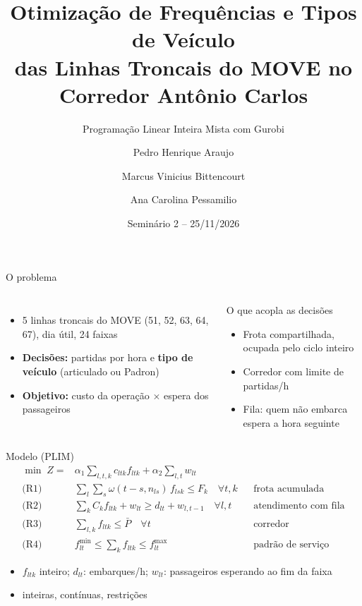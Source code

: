 \documentclass[aspectratio=169,11pt]{beamer}
\title{Otimização de Frequências e Tipos de Veículo\\das Linhas Troncais do MOVE no Corredor Antônio Carlos}
\subtitle{Programação Linear Inteira Mista com Gurobi}
\author{Pedro Henrique Araujo \and Marcus Vinicius Bittencourt \and Ana Carolina Pessamilio}
\institute{Pesquisa Operacional -- DEE/EE/UFMG}
\date{Seminário 2 -- 25/11/2026}
\newcommand{\destaque}[1]{{\color{azul}\textbf{#1}}}
\begin{document}
\begin{frame}
\titlepage
\end{frame}

\begin{frame}{O problema}
\begin{columns}[T]
\begin{itemize}
\item 5 linhas troncais do MOVE (51, 52, 63, 64, 67), dia útil, 24 faixas
\item \destaque{Decisões:} partidas por hora e \destaque{tipo de veículo} (articulado ou Padron)
\item \destaque{Objetivo:} custo da operação $\times$ espera dos passageiros
\end{itemize}
\begin{block}{O que acopla as decisões}
\small
\begin{itemize}
\item Frota compartilhada, ocupada pelo ciclo inteiro
\item Corredor com limite de partidas/h
\item Fila: quem não embarca espera a hora seguinte
\end{itemize}
\end{block}
\end{columns}
\end{frame}

\begin{frame}{Modelo (PLIM)}
\small
\begin{align*}
\min\; Z = {}& \alpha_1 \textstyle\sum_{l,t,k} c_{ltk} f_{ltk} + \alpha_2 \sum_{l,t} w_{lt}\\
\text{(R1)}\ & \textstyle\sum_{l}\sum_{s} \omega(t-s, n_{ls})\, f_{lsk} \le F_k \quad \forall t,k && \text{frota acumulada}\\
\text{(R2)}\ & \textstyle\sum_k C_k f_{ltk} + w_{lt} \ge d_{lt} + w_{l,t-1} \quad \forall l,t && \text{atendimento com fila}\\
\text{(R3)}\ & \textstyle\sum_{l,k} f_{ltk} \le \bar P \quad \forall t && \text{corredor}\\
\text{(R4)}\ & f^{\min}_{lt} \le \textstyle\sum_k f_{ltk} \le f^{\max}_{lt} && \text{padrão de serviço}
\end{align*}
\begin{itemize}
\item $f_{ltk}$ inteiro; $d_{lt}$: embarques/h; $w_{lt}$: passageiros esperando ao fim da faixa
\item \nVarInt{} inteiras, \nVarCont{} contínuas, \nRestr{} restrições
\end{itemize}
\end{frame}
\end{document}

